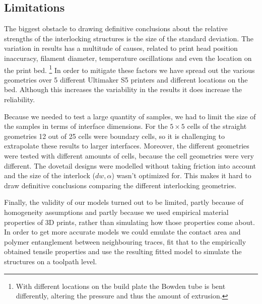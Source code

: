 \subsection{Limitations}
The biggest obstacle to drawing definitive conclusions about the relative strengths of the interlocking structures is the size of the standard deviation.
The variation in results has a multitude of causes, related to print head position inaccuracy, filament diameter, temperature oscillations and even the location on the print bed.
\footnote{With different locations on the build plate the Bowden tube is bent differently, altering the pressure and thus the amount of extrusion.}
In order to mitigate these factors we have spread out the various geometries over 5 different Ultimaker S5 printers and different locations on the bed.
Although this increases the variability in the results it does increase the reliability.

Because we needed to test a large quantity of samples, we had to limit the size of the samples in terms of interface dimensions.
For the $5\times5$ cells of the straight geometries 12 out of 25 cells were boundary cells, so it is challenging to extrapolate these results to larger interfaces.
Moreover, the different geometries were tested with different amounts of cells, because the cell geometries were very different.
The dovetail designs were modelled without taking friction into account and the size of the interlock ($dw, \alpha$) wasn't optimized for.
This makes it hard to draw definitive conclusions comparing the different interlocking geometries.

Finally, the validity of our models turned out to be limited,
partly because of homogeneity assumptions and partly because we used empirical material properties of 3D prints, rather than simulating how those properties come about.
In order to get more accurate models we could emulate the contact area and polymer entanglement between neighbouring traces,
fit that to the empirically obtained tensile properties and use the resulting fitted model to simulate the structures on a toolpath level.
